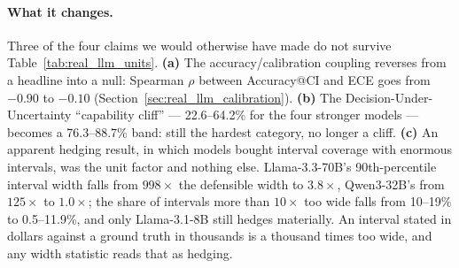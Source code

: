 \documentclass{article}
\begin{document}
\begin{table}[t]
\centering
\caption{Unit accounting. \textbf{Err} is the number of predictions scored incorrect under the original (v1) prompt; \textbf{UM} is how many of those are corroborated unit mismatches. The remaining columns give each headline metric under the v1-prompt scoring and under the unit-aware scoring used everywhere else in this paper. The correction is not a constant shift: it is worth $+10.6$ points to Qwen3-32B and $+1.4$ to Llama-3.1-8B, which is why it reorders the leaderboard and why it cannot be waved through as noise.}
\label{tab:real_llm_units}
\end{table}

\paragraph{What it changes.} Three of the four claims we would otherwise have made do not survive Table~\ref{tab:real_llm_units}. \textbf{(a)} The accuracy/calibration coupling reverses from a headline into a null: Spearman $\rho$ between Accuracy@CI and ECE goes from $-0.90$ to $-0.10$ (Section~\ref{sec:real_llm_calibration}). \textbf{(b)} The Decision-Under-Uncertainty ``capability cliff'' --- 22.6--64.2\% for the four stronger models --- becomes a 76.3--88.7\% band: still the hardest category, no longer a cliff. \textbf{(c)} An apparent hedging result, in which models bought interval coverage with enormous intervals, was the unit factor and nothing else. Llama-3.3-70B's 90th-percentile interval width falls from $998\times$ the defensible width to $3.8\times$, Qwen3-32B's from $125\times$ to $1.0\times$; the share of intervals more than $10\times$ too wide falls from 10--19\% to 0.5--11.9\%, and only Llama-3.1-8B still hedges materially. An interval stated in dollars against a ground truth in thousands is a thousand times too wide, and any width statistic reads that as hedging.
\end{document}

